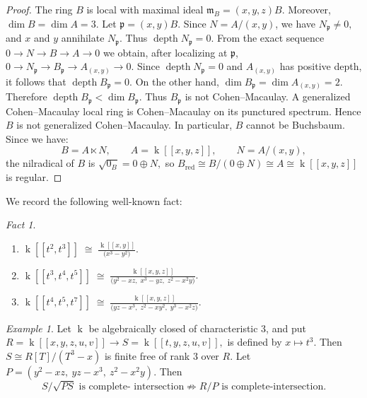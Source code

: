 \documentclass[10pt,a4paper]{amsart}
\theoremstyle{definition}
\theoremstyle{remark}
\newtheorem{example}[theorem]{Example}
\newtheorem{fact}[theorem]{Fact}
\newcommand{\kk}{\operatorname{k}}
\begin{document}
\begin{proof}
	The ring \(B\) is local with maximal ideal
 $
	\mathfrak m_B=(x,y,z)B.
 $
 	Moreover,
 $
	\dim B=\dim A=3.
	$ 	Let
 $
	\mathfrak p=(x,y)B.
	$ 	Since \(N=A/(x,y)\), we have
 $
	N_{\mathfrak p}\neq 0,
 $
 and \(x\) and \(y\) annihilate \(N_{\mathfrak p}\). Thus
 $
	\operatorname{depth}N_{\mathfrak p}=0.
	$ 	From the exact sequence
 $
	0\to N\to B\to A\to0
	$ we obtain, after localizing at \(\mathfrak p\),
$
	0\to N_{\mathfrak p}
	\to B_{\mathfrak p}
	\to A_{(x,y)}
	\to0.
	$ Since
 $
	\operatorname{depth}N_{\mathfrak p}=0
 $
 and \(A_{(x,y)}\) has positive depth, it follows that
 $
	\operatorname{depth}B_{\mathfrak p}=0.
	$ On the other hand,
 $
	\dim B_{\mathfrak p}
	=
	\dim A_{(x,y)}
	=
	2.
	$ 
 Therefore
  $
	\operatorname{depth}B_{\mathfrak p}
	<
	\dim B_{\mathfrak p}.
	$ 
	Thus \(B_{\mathfrak p}\) is not Cohen--Macaulay.
 A generalized Cohen--Macaulay local ring is Cohen--Macaulay on its
	punctured spectrum. Hence \(B\) is not generalized Cohen--Macaulay.
	In particular, \(B\) cannot be Buchsbaum.
  Since we have:
	\[
	B=A\ltimes N,\qquad A=\kk[[x,y,z]],\qquad N=A/(x,y),
	\]
the nilradical of \(B\) is
	\(
	\sqrt{0_B}=0\oplus N,
	\)
	so
	\(
	B_{\mathrm{red}}
	\cong B/(0\oplus N)
	\cong A
	\cong \kk[[x,y,z]] 
	\)
	 is  regular.
 \end{proof}
We record the following well-known fact:

\begin{fact}\label{rel} 	\begin{enumerate}
\item[(i)] \(\kk[[t^2,t^3]] \;\cong\; \frac{\kk[[x,y]]}{\bigl(x^3-y^2 \bigr)}\).
\item[(ii)] 
\(\kk[[t^3,t^4,t^5]] \;\cong\; \frac{\kk[[x,y,z]]}{\bigl(y^2 - xz,\; x^3 - yz,\; z^2 - x^2 y\bigr)}\).
\item[(iii)]
\(\kk[[t^4,t^5,t^7]] \;\cong\; \frac{\kk[[x,y,z]]}{\bigl(yz - x^3,\; z^2 - xy^2,\; y^3 - x^2 z\bigr)}\).
 		\end{enumerate}

 	\end{fact}

\begin{example}\label{32}
	Let $\kk$ be algebraically closed of characteristic $3$, and put
	\(
	R=\kk[[x,y,z,u,v]]\to S=\kk[[t,y,z,u,v]],
	\)
is defined by $x\mapsto t^3$. Then
	\(
	S\cong R[T]/(T^3-x)
	\)
	is finite free of rank $3$ over $R$. Let
	\(
	P=(y^2-xz,\ yz-x^3,\ z^2-x^2y).
	\)
	Then \[
	{S/\sqrt{PS}\text{ is complete- intersection}\not\Longrightarrow R/P\text{ is complete-intersection}}.
	\]
\end{example}
\end{document}
